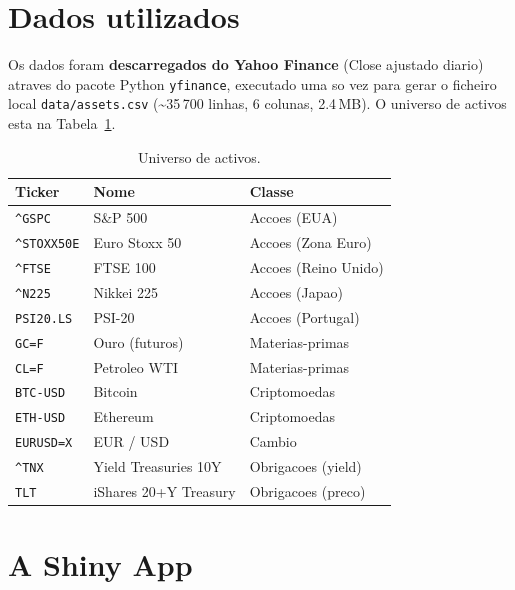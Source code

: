 \documentclass[11pt,a4paper]{article}
\begin{document}
\section{Dados utilizados}

Os dados foram \textbf{descarregados do Yahoo Finance} (Close ajustado
diario) atraves do pacote Python \texttt{yfinance}, executado uma so
vez para gerar o ficheiro local \texttt{data/assets.csv}
(\textasciitilde{}35\,700 linhas, 6 colunas, 2.4\,MB). O universo de
activos esta na Tabela~\ref{tab:assets}.

\begin{table}[H]\centering
\caption{Universo de activos.}\label{tab:assets}
\begin{tabular}{lll}
\toprule
\textbf{Ticker} & \textbf{Nome} & \textbf{Classe} \\ \midrule
\verb|^GSPC|     & S\&P 500              & Accoes (EUA)         \\
\verb|^STOXX50E| & Euro Stoxx 50         & Accoes (Zona Euro)   \\
\verb|^FTSE|     & FTSE 100              & Accoes (Reino Unido) \\
\verb|^N225|     & Nikkei 225            & Accoes (Japao)       \\
\verb|PSI20.LS|  & PSI-20                & Accoes (Portugal)    \\
\verb|GC=F|      & Ouro (futuros)        & Materias-primas      \\
\verb|CL=F|      & Petroleo WTI          & Materias-primas      \\
\verb|BTC-USD|   & Bitcoin               & Criptomoedas         \\
\verb|ETH-USD|   & Ethereum              & Criptomoedas         \\
\verb|EURUSD=X|  & EUR / USD             & Cambio               \\
\verb|^TNX|      & Yield Treasuries 10Y  & Obrigacoes (yield)   \\
\verb|TLT|       & iShares 20+Y Treasury & Obrigacoes (preco)   \\
\bottomrule
\end{tabular}
\end{table}

\section{A Shiny App}
\end{document}
